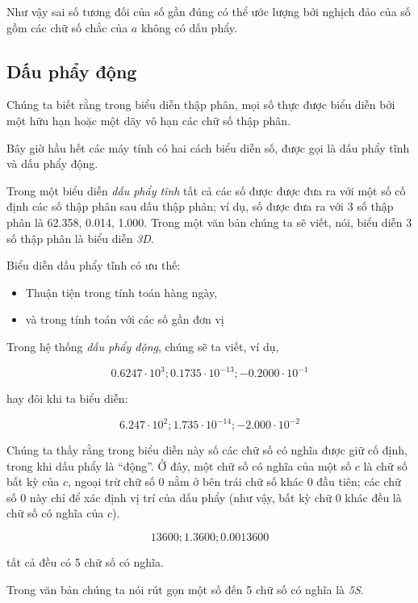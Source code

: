 \documentclass[../../Lectures.tex]{subfiles}
\begin{document}
Như vậy sai số tương đối của số gần đúng có thể ước lượng bởi nghịch đảo của số
gồm các chữ số chắc của \(a\) không có dấu phẩy.

\subsection{Dấu phẩy động}

Chúng ta biết rằng trong biểu diễn thập phân, mọi số thực được biểu diễn bởi một
hữu hạn hoặc một dãy vô hạn các chữ số thập phân.

Bây giờ hầu hết các máy tính có hai cách biểu diễn số, được gọi là dấu phẩy tĩnh
và dấu phẩy động.

Trong một biểu diễn \emph{dấu phẩy tĩnh} tất cả các số được được đưa ra với một
số cố định các số thập phân sau dấu thập phân; ví dụ, số được đưa ra với 3 số
thập phân là \num{62.358}, \num{0.014}, \num{1.000}. Trong một văn bản chúng ta
sẽ viết, nói, biểu diễn 3 số thập phân là biểu diễn \emph{3D}.

Biểu diễn dấu phẩy tĩnh có ưu thế:

\begin{itemize}
    \item Thuận tiện trong tính toán hàng ngày,
    \item và trong tính toán với các số gần đơn vị
\end{itemize}

Trong hệ thống \emph{dấu phẩy động}, chúng sẽ ta viết, ví dụ,

\[\num{0.6247} \cdot 10^3; \num{0.1735} \cdot 10^{-13}; \num{-0.2000} \cdot 10^{-1}\]

hay đôi khi ta biểu diễn:

\[\num{6.247} \cdot 10^2; \num{1.735} \cdot 10^{-14}; \num{-2.000} \cdot 10^{-2}\]

Chúng ta thấy rằng trong biểu diễn này số các chữ số có nghĩa được giữ cố định,
trong khi dấu phẩy là ``động''. Ở đây, một chữ số có nghĩa của một số \(c\) là
chữ số bất kỳ của \(c\), ngoại trừ chữ số \(0\) nằm ở bên trái chữ số khác \(0\)
đầu tiên; các chữ số \(0\) này chỉ để xác định vị trí của dấu phẩy (như vậy, bất
kỳ chữ \(0\) khác đều là chữ số có nghĩa của \(c\)).

\begin{exmp}
    \[\num{13600}; \num{1.3600}; \num{0.0013600}\]

    tất cả đều có 5 chữ số có nghĩa.
\end{exmp}

Trong văn bản chúng ta nói rút gọn một số đến 5 chữ số có nghĩa là \emph{5S}.
\end{document}
